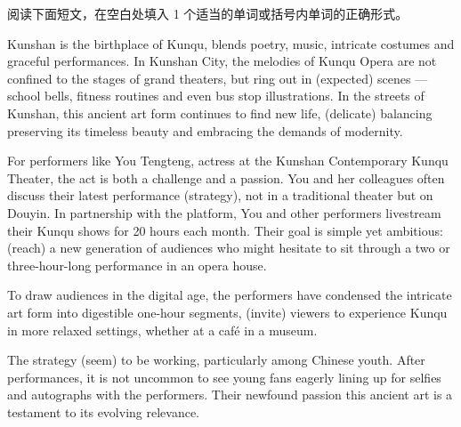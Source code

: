 \documentclass{英语试卷}
\begin{document}
\par 阅读下面短文，在空白处填入 1 个适当的单词或括号内单词的正确形式。\par
\par Kunshan is the birthplace of Kunqu,  blends poetry, music, intricate costumes and graceful performances. In Kunshan City, the melodies of Kunqu Opera are not confined to the stages of grand theaters, but ring out in  (expected) scenes — school bells, fitness routines and even bus stop illustrations. In the streets of Kunshan, this ancient art form continues to find new life,  (delicate) balancing preserving its timeless beauty and embracing the demands of modernity.\par
\par For performers like You Tengteng,  actress at the Kunshan Contemporary Kunqu Theater, the act is both a challenge and a passion. You and her colleagues often discuss their latest performance  (strategy), not in a traditional theater but on Douyin. In partnership with the platform, You and other performers livestream their Kunqu shows for 20 hours each month. Their goal is simple yet ambitious:  (reach) a new generation of audiences who might hesitate to sit through a two or three-hour-long performance in an opera house.\par
\par To draw audiences in the digital age, the performers have condensed the intricate art form into digestible one-hour segments,  (invite) viewers to experience Kunqu in more relaxed settings, whether at a café  in a museum.\par
\par The strategy  (seem) to be working, particularly among Chinese youth. After performances, it is not uncommon to see young fans eagerly lining up for selfies and autographs with the performers. Their newfound passion  this ancient art is a testament to its evolving relevance.\par
\end{document}
